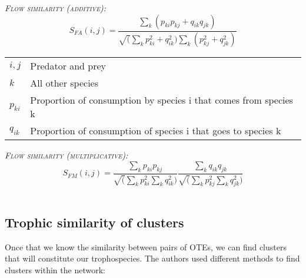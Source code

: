 \documentclass{article}
\makeatletter
\newenvironment{conditions}
  {\par\vspace{\abovedisplayskip}\noindent\begin{tabular}{>{$}l<{$} @{${}={}$} l}}
  {\end{tabular}\par\vspace{\belowdisplayskip}}
\makeatother
\begin{document}
    \bigskip
    \noindent \textrm{\textsc{\textsl{Flow similarity (additive):}}} 
    \begin{equation}
        S_{FA}(i,j)=\frac{\sum_k(p_{ki}p_{kj}+q_{ik}q_{jk})}{\sqrt(\sum_kp^2_{ki}+q^2_{ik})\sum_k(p^2_{kj}+q^2_{jk})}
    \end{equation}
    \begin{conditions}
        i, j & Predator and prey \\
        k & All other species \\
        p_{ki} & Proportion of consumption by species i that comes from species k \\
        q_{ik} & Proportion of consumption of species i that goes to species k \\
    \end{conditions}

    \bigskip
    \noindent \textrm{\textsc{\textsl{Flow similarity (multiplicative):}}} 
    \begin{equation}
        S_{FM}(i,j)=\frac{\sum_kp_{ki}p_{kj}}{\sqrt(\sum_kp^2_{ki}\sum_kq^2_{ik})}\frac{\sum_kq_{ik}q_{jk}}{\sqrt(\sum_kp^2_{kj}\sum_kq^2_{jk})}
    \end{equation}
    \begin{conditions}
    \end{conditions}






    \subsection{Trophic similarity of clusters}
    Once that we know the similarity between pairs of OTEs, we can find clusters that will constitute our trophospecies. 
    The authors used different methods to find clusters within the network:
    
\end{document}

